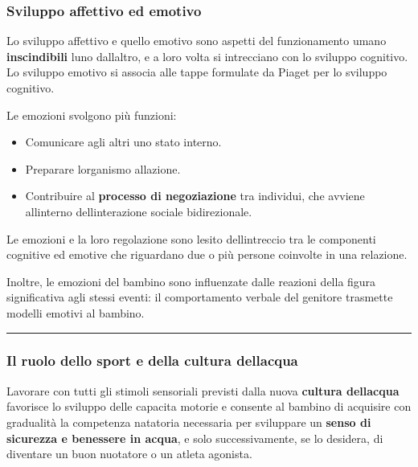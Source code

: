 \documentclass[a4paper,11pt]{article}
\providecommand{\tightlist}{%
  \setlength{\itemsep}{0pt}\setlength{\parskip}{0pt}}
\begin{document}
\subsubsection{Sviluppo affettivo ed
      emotivo}\label{sviluppo-affettivo-ed-emotivo}

Lo sviluppo affettivo e quello emotivo sono aspetti del funzionamento
umano \textbf{inscindibili} l\textquotesingle uno
dall\textquotesingle altro, e a loro volta si intrecciano con lo
sviluppo cognitivo. Lo sviluppo emotivo si associa alle tappe formulate
da Piaget per lo sviluppo cognitivo.

Le emozioni svolgono più funzioni:

\begin{itemize}
      \tightlist
      \item
            Comunicare agli altri uno stato interno.
      \item
            Preparare l\textquotesingle organismo all\textquotesingle azione.
      \item
            Contribuire al \textbf{processo di negoziazione} tra individui, che
            avviene all\textquotesingle interno dell\textquotesingle interazione
            sociale bidirezionale.
\end{itemize}

Le emozioni e la loro regolazione sono l\textquotesingle esito
dell\textquotesingle intreccio tra le componenti cognitive ed emotive
che riguardano due o più persone coinvolte in una relazione.

Inoltre, le emozioni del bambino sono influenzate dalle reazioni della
figura significativa agli stessi eventi: il comportamento verbale del
genitore trasmette modelli emotivi al bambino.

\begin{center}\rule{0.5\linewidth}{0.5pt}\end{center}

\subsubsection{Il ruolo dello sport e della cultura
      dell\textquotesingle acqua}\label{il-ruolo-dello-sport-e-della-cultura-dellacqua}

Lavorare con tutti gli stimoli sensoriali previsti dalla nuova
\textbf{cultura dell\textquotesingle acqua} favorisce lo sviluppo delle
capacita motorie e consente al bambino di acquisire con gradualità la
competenza natatoria necessaria per sviluppare un \textbf{senso di
      sicurezza e benessere in acqua}, e solo successivamente, se lo desidera,
di diventare un buon nuotatore o un atleta agonista.
\end{document}
